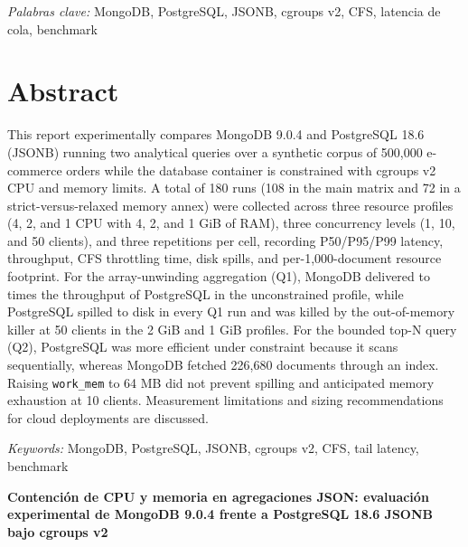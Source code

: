 \documentclass[12pt,letterpaper]{article}
\newcommand{\titulo}{Contención de CPU y memoria en agregaciones JSON: evaluación experimental de MongoDB 9.0.4 frente a PostgreSQL 18.6 JSONB bajo cgroups v2}
\newcommand{\code}[1]{\texttt{#1}}
\begin{document}
\vspace{0.5\baselineskip}
\noindent\hspace{0.5in}\textit{Palabras clave:} MongoDB, PostgreSQL, JSONB, cgroups v2, CFS, latencia de cola, benchmark
\clearpage

\section{Abstract}
\noindent
This report experimentally compares MongoDB 9.0.4 and PostgreSQL 18.6 (JSONB) running two analytical queries over a
synthetic corpus of 500,000 e-commerce orders while the database container is constrained with cgroups v2 CPU and
memory limits. A total of 180 runs (108 in the main matrix and 72 in a strict-versus-relaxed memory annex) were
collected across three resource profiles (4, 2, and 1 CPU with 4, 2, and 1 GiB of RAM), three concurrency levels
(1, 10, and 50 clients), and three repetitions per cell, recording P50/P95/P99 latency, throughput, CFS throttling time,
disk spills, and per-1,000-document resource footprint. For the array-unwinding aggregation (Q1), MongoDB delivered
 to  times the throughput of PostgreSQL in the unconstrained profile, while PostgreSQL
spilled to disk in every Q1 run and was killed by the out-of-memory killer at 50 clients in the 2 GiB and 1 GiB
profiles. For the bounded top-N query (Q2), PostgreSQL was more efficient under constraint because it scans sequentially,
whereas MongoDB fetched 226,680 documents through an index. Raising \code{work\_mem} to 64 MB did not prevent spilling and
anticipated memory exhaustion at 10 clients. Measurement limitations and sizing recommendations for cloud deployments are discussed.

\vspace{0.5\baselineskip}
\noindent\hspace{0.5in}\textit{Keywords:} MongoDB, PostgreSQL, JSONB, cgroups v2, CFS, tail latency, benchmark
\clearpage

\begin{center}\bfseries \titulo\end{center}
\end{document}
